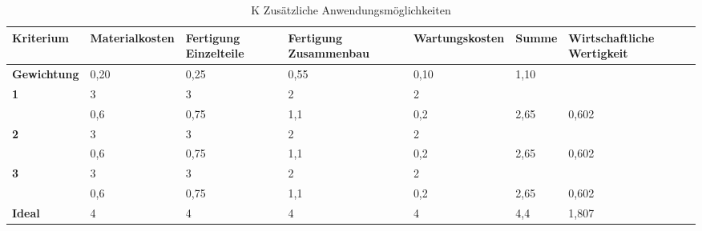 \documentclass{article}
\begin{document}
\begin{table}[h!]
    \centering
    \hspace*{0in} %
    \begin{tabular}{>{\bfseries}p{2cm} p{2.2cm} p{2cm} p{2cm} p{2.5cm} p{2cm} p{2cm}}
        \toprule
        Kriterium  & Materialkosten & Fertigung Einzelteile & Fertigung Zusammenbau & Wartungskosten & Summe & Wirtschaftliche Wertigkeit \\
        \midrule
        Gewichtung & 0,20           & 0,25                  & 0,55                  & 0,10           & 1,10  &                            \\
        \midrule
        1          & 3              & 3                     & 2                     & 2              &       &                            \\
                   & 0,6            & 0,75                  & 1,1                   & 0,2            & 2,65  & 0,602                      \\
        \midrule
        2          & 3              & 3                     & 2                     & 2              &       &                            \\
                   & 0,6            & 0,75                  & 1,1                   & 0,2            & 2,65  & 0,602                      \\
        \midrule
        3          & 3              & 3                     & 2                     & 2              &       &                            \\
                   & 0,6            & 0,75                  & 1,1                   & 0,2            & 2,65  & 0,602                      \\
        \midrule
        Ideal      & 4              & 4                     & 4                     & 4              & 4,4   & 1,807                      \\
        \bottomrule
    \end{tabular}
    \caption{K Zusätzliche Anwendungsmöglichkeiten}
\end{table}
\end{document}
